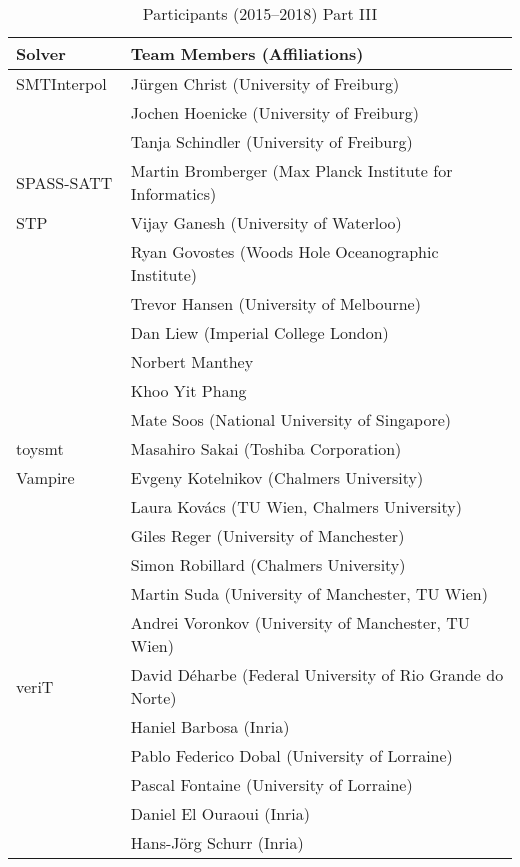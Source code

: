 {  \begin{table}
    \centering
    \caption{Participants (2015--2018) Part III}
    \label{table:participants3}
    \begin{tabular}{ll}
      \toprule
      Solver & Team Members (Affiliations)\\
      \midrule \midrule

      SMTInterpol~\cite{DBLP:conf/spin/ChristHN12}
      & J\"urgen Christ (University of Freiburg) \\
      & Jochen Hoenicke (University of Freiburg) \\
      & Tanja Schindler (University of Freiburg)
      \\ \midrule

      SPASS-SATT
      & Martin Bromberger (Max Planck Institute for Informatics)
      \\ \midrule

      STP~\cite{ganesh07}
      & Vijay Ganesh (University of Waterloo) \\
      & Ryan Govostes (Woods Hole Oceanographic Institute) \\
      & Trevor Hansen (University of Melbourne) \\
      & Dan Liew (Imperial College London) \\
      & Norbert Manthey \\
      & Khoo Yit Phang \\
      & Mate Soos (National University of Singapore)
      \\ \midrule

      toysmt
      & Masahiro Sakai (Toshiba Corporation)
      \\ \midrule

      Vampire~\cite{DBLP:conf/cav/KovacsV13}
      & Evgeny Kotelnikov (Chalmers University) \\
      & Laura Kov\'acs (TU Wien, Chalmers University) \\
      & Giles Reger (University of Manchester) \\
      & Simon Robillard (Chalmers University) \\
      & Martin Suda (University of Manchester, TU Wien) \\
      & Andrei Voronkov (University of Manchester, TU Wien)
      \\ \midrule

      veriT~\cite{DBLP:conf/cade/BoutonODF09}
      & David D\'eharbe (Federal University of Rio Grande do Norte) \\
      & Haniel Barbosa (Inria) \\
      & Pablo Federico Dobal (University of Lorraine) \\
      & Pascal Fontaine (University of Lorraine) \\
      & Daniel El Ouraoui (Inria) \\
      & Hans-J\"org Schurr (Inria)
      \\ \midrule


\end{tabular}
\end{table}}
